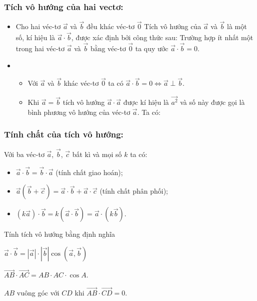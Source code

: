 \subsubsection{Tích vô hướng của hai vectơ:} 
\begin{itemize}
	\item [\iconMT] Cho hai véc-tơ $\vec{a}$ và $\vec{b}$ đều khác véc-tơ $\vec{0}$ Tích vô hướng của $\vec{a}$ và $\vec{b}$ là một số, kí hiệu là $\vec{a}\cdot\vec{b}$, được xác định bởi công thức sau:
		Trường hợp ít nhất một trong hai véc-tơ $\vec{a}$ và $\vec{b}$ bằng véc-tơ $\vec{0}$ ta quy ước $\vec{a}\cdot\vec{b}=0$.
	\item [\iconMT] 
		\begin{itemize}
			\item Với $\vec{a}$ và $\vec{b}$ khác véc-tơ $\vec{0}$ ta có $\vec{a}\cdot\vec{b}=0\Leftrightarrow \vec{a}\perp \vec{b}$. 
			\item Khi $\vec{a}=\vec{b}$ tích vô hướng $\vec{a}\cdot\vec{a}$ được kí hiệu là $\vec{a^2}$ và số này được gọi là bình phương vô hướng của véc-tơ $\vec{a}$. Ta có:
		\end{itemize}
\end{itemize}
\subsubsection{Tính chất của tích vô hướng:}
Với ba véc-tơ $\vec{a}$, $\vec{b}$, $\vec{c}$ bất kì và mọi số $k$ ta có:
\begin{tcolorbox}[colframe=orange,colback=white,boxrule=0.2mm]
	\begin{itemize}
		\item $\vec{a}\cdot \vec{b}=\vec{b}\cdot \vec{a}$ (tính chất giao hoán);
		\item $\vec{a}\left(\vec{b}+\vec{c}\right)=\vec{a}\cdot \vec{b}+\vec{a}\cdot \vec{c}$ (tính chất phân phối);
		\item $(k\vec{a})\cdot \vec{b}=k(\vec{a}\cdot \vec{b})=\vec{a}\cdot (k\vec{b})$.
	\end{itemize}
\end{tcolorbox}

\begin{dang}{Tính tích vô hướng bằng định nghĩa}
	\begin{listEX}[1]
		\item [\ding{172}] $\vec{a}\cdot \vec{b}=\left|\vec{a}\right|\cdot \left|\vec{b}\right|\cos\left(\vec{a},\vec{b}\right)$
		\item [\ding{173}] $\vec{AB} \cdot \vec{AC} = AB \cdot AC \cdot \cos A$. 
		\item [\ding{174}] $AB$ vuông góc với $CD$ khi $\vec{AB} \cdot \vec{CD}=0$. 
	\end{listEX}
\end{dang}

